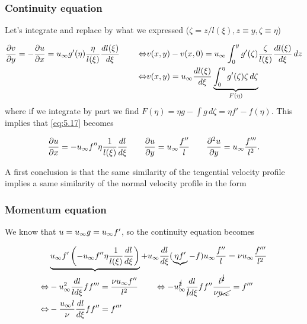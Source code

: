 		\subsubsection{Continuity equation}
			Let's integrate and replace by what we expressed ($\zeta = z/l(\xi), z \equiv y, \zeta \equiv \eta$)
	
			\begin{equation}
			\begin{aligned}
				\frac{\partial v}{\partial y} =- \frac{\partial u}{\partial x} = u_\infty g'(\eta) \frac{\eta}{l(\xi)} \frac{dl(\xi)}{d\xi} \qquad \Leftrightarrow &v(x,y) - v(x,0) = u_\infty \int _0 ^y g'(\zeta) \frac{\zeta}{l(\xi)} \frac{dl(\xi)}{d\xi} \, dz\\
				\Leftrightarrow &v(x,y) = u_\infty \frac{dl(\xi)}{d\xi} \underbrace{\int _0 ^\eta g'(\zeta) \zeta  \, d\zeta}_{F(\eta)}
			\end{aligned}	
			\end{equation}
			where if we integrate by part we find $F(\eta) = \eta g - \int g\, d\zeta = \eta f' - f(\eta)$. This implies that \eqref{eq:5.17} becomes 
			
			\begin{equation}
				\frac{\partial u }{\partial x} = - u_\infty f''\eta \frac{1}{l(\xi)} \frac{dl}{d\xi} \qquad \frac{\partial u}{\partial y} = u_\infty \frac{f''}{l} \qquad \frac{\partial ^2 u}{\partial y }= u_\infty \frac{f'''}{l^2}.
			\end{equation}
			
			A first conclusion is that the same similarity of the tengential velocity profile implies a same similarity of the normal velocity profile in the form
			
			\begin{center}
			\end{center}
			
		\subsubsection{Momentum equation}
			We know that $u = u_\infty g = u_\infty f'$, so the continuity equation becomes
			
			\begin{equation}
			\begin{aligned}
				&\underbrace{u_\infty f' \left(  - u_\infty f''\eta \frac{1}{l(\xi)} \frac{dl}{d\xi} \right)} + u_\infty \frac{dl}{d\xi}(\underbrace{\eta f'} - f) u_\infty \frac{f''}{l} = \nu u_\infty \frac{f'''}{l^2} \\
				\Leftrightarrow  &- u_\infty ^2 \frac{dl}{ld \xi} ff''' = \frac{  \nu u_\infty f''}{l^2} \qquad \Leftrightarrow - u_\infty ^{\cancel{2}} \frac{dl}{\cancel{l}d \xi} ff'' \frac{l^{\cancel{2}}}{\nu \cancel{u_\infty}} = f'''\\
				\Leftrightarrow &-\frac{u_\infty l}{\nu} \frac{dl}{d\xi} ff'' = f'''
			\end{aligned}
			\end{equation}
			
